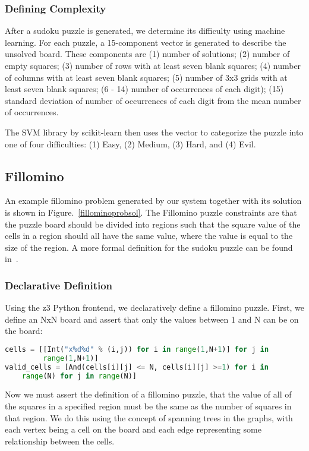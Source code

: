 \subsubsection{Defining Complexity}
After a sudoku puzzle is generated, we determine its difficulty using
machine learning. For each puzzle, a 15-component vector is generated to describe the unsolved board. These components are (1) number of solutions; (2) number of empty squares; (3) number of rows with at least seven blank squares; (4) number of columns with at least seven blank squares; (5) number of 3x3 grids with at least seven blank squares; (6 - 14) number of occurrences of each digit); (15) standard deviation of number of occurrences of each digit from the mean number of occurrences.

The SVM library by scikit-learn then uses the vector to categorize the
puzzle into one of four difficulties: (1) Easy, (2) Medium, (3) Hard,
and (4) Evil.

\subsection{Fillomino}

An example fillomino problem generated by our system together with its
solution is shown in Figure.~\ref{fillominoprobsol}. The Fillomino puzzle constraints are that the puzzle board should be divided into regions such that the square value of the cells in a region should all have the same value, where the value is equal to the size of the region. A more formal definition for the sudoku puzzle can be found in~\cite{fillominodef}.

\subsubsection{Declarative Definition}
Using the z3 Python frontend, we declaratively define a fillomino puzzle.
First, we define an NxN board and assert that only the values between
1 and N can be on the board: 

\singlespace
\begin{lstlisting}[language=python, frame=single]
cells = [[Int("x%d%d" % (i,j)) for i in range(1,N+1)] for j in
         range(1,N+1)]
valid_cells = [And(cells[i][j] <= N, cells[i][j] >=1) for i in
	range(N) for j in range(N)]
\end{lstlisting}
\doublespace

Now we must assert the definition of a fillomino puzzle, that the
value of all of the squares in a specified region must be the same as
the number of squares in that region. We do this using the concept of
spanning trees in the graphs, with each vertex being a cell on the board
and each edge representing some relationship between the cells.

